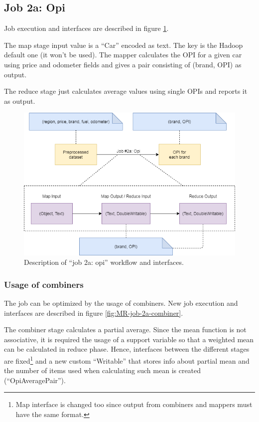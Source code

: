 \subsection{Job 2a: Opi}

Job execution and interfaces are described in figure \ref{fig:MR-job-2a}.

The map stage input value is a ``Car'' encoded as text. The key is the Hadoop default one (it won't be used). The mapper calculates the OPI for a given car using price and odometer fields and gives a pair consisting of (brand, OPI) as output.

The reduce stage just calculates average values using single OPIs and reports it as output.
   
\begin{figure}[H]
	\centering
	\includegraphics[scale=0.7]{images/2-mapreduce/MR-job-2a.png}
	\caption{Description of ``job 2a: opi'' workflow and interfaces.}
	\label{fig:MR-job-2a}
\end{figure}

\subsubsection{Usage of combiners}

The job can be optimized by the usage of combiners. New job execution and interfaces are described in figure \ref{fig:MR-job-2a-combiner}.

The combiner stage calculates a partial average. Since the mean function is not associative, it is required the usage of a support variable so that a weighted mean can be calculated in reduce phase. Hence, interfaces between the different stages are fixed\footnote{Map interface is changed too since output from combiners and mappers must have the same format.} and a new custom ``Writable'' that stores info about partial mean and the number of items used when calculating such mean is created (``OpiAveragePair'').

